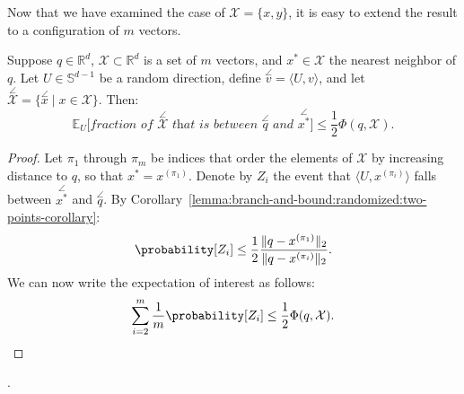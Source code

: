 Now that we have examined the case of $\mathcal{X} = \{ x, y\}$, it is easy to extend
the result to a configuration of $m$ vectors.

\begin{theorem}
    \label{theorem:branch-and-bound:randomized:m-points}
    Suppose $q \in \mathbb{R}^d$, $\mathcal{X} \subset \mathbb{R}^d$ is a set of $m$ vectors,
    and $x^\ast \in \mathcal{X}$ the nearest neighbor of $q$.
    Let $U \in \mathbb{S}^{d-1}$ be a random direction, define $\overset{\angle}{v} = \langle U, v \rangle$,
    and let $\overset{\angle}{\mathcal{X}} = \{ \overset{\angle}{x} \;|\; x \in \mathcal{X} \}$.
    Then:
    \begin{equation*}
        \mathbb{E}_{U} \big[ \textit{fraction of $\overset{\angle}{\mathcal{X}}$ that is between
        $\overset{\angle}{q}$ and $\overset{\angle}{x^\ast}$} \big] \leq \frac{1}{2} \Phi(q, \mathcal{X}).
    \end{equation*}
\end{theorem}
\begin{proof}
    Let $\pi_1$ through $\pi_m$ be indices that order the elements of $\mathcal{X}$ by increasing distance to $q$,
    so that $x^\ast = x^{(\pi_1)}$. Denote by $Z_i$ the event that $\langle U, x^{(\pi_i)} \rangle$ falls between $\overset{\angle}{x^\ast}$
    and $\overset{\angle}{q}$. By Corollary~\ref{lemma:branch-and-bound:randomized:two-points-corollary}:
    \begin{equation*}
        \probability[Z_i] \leq \frac{1}{2} \frac{\lVert q - x^{(\pi_1)} \rVert_2}{\lVert q - x^{(\pi_i)} \rVert_2}.
    \end{equation*}
    We can now write the expectation of interest as follows:
    \begin{equation*}
        \sum_{i=2}^{m} \frac{1}{m} \probability[ Z_i ] \leq \frac{1}{2} \Phi(q, \mathcal{X}).
    \end{equation*}
\end{proof}.

